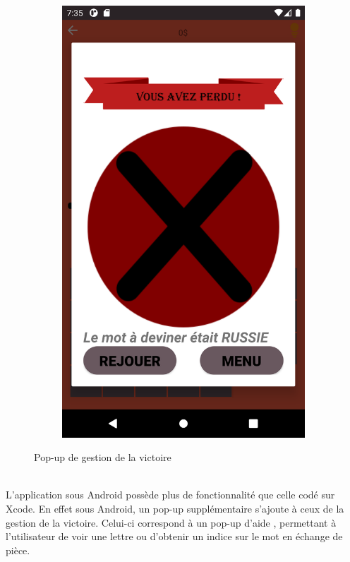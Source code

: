 \documentclass{article}
\begin{document}
\begin{figure}[!h]
    \begin{subfigure}{}
        \includegraphics[scale=0.06]{defaite.png}
    \end{subfigure}
    \caption{Pop-up de gestion de la victoire}
    \end{figure}
\\L'application sous Android possède plus de fonctionnalité que celle codé sur Xcode. En effet sous Android, un pop-up supplémentaire s'ajoute à ceux de la gestion de la victoire. Celui-ci correspond à un pop-up d'aide , permettant à l'utilisateur de voir une lettre ou d'obtenir un indice sur le mot en échange de pièce.
\end{document}
